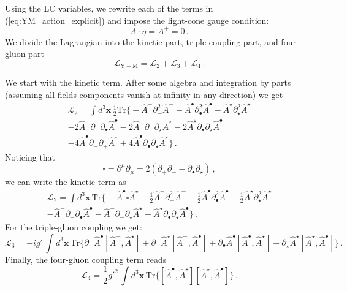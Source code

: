 \documentclass[english,american]{article}
\begin{document}
Using the LC variables, we rewrite each of the terms in (\ref{eq:YM_action_explicit})
and impose the light-cone gauge condition:
\begin{equation}
A\cdot\eta=A^{+}=0\,.
\end{equation}
We divide the Lagrangian into the kinetic part, triple-coupling part,
and four-gluon part
\begin{equation}
\mathcal{L}_{\mathrm{Y-M}}=\mathcal{L}_{2}+\mathcal{L}_{3}+\mathcal{L}_{4}\,.\label{eq:LagrangianFull}
\end{equation}
 

We start with the kinetic term. After some algebra and integration
by parts (assuming all fields components vanish at infinity in any
direction) we get
\begin{multline}
\mathcal{L}_{2}=\int d^{3}\mathbf{x}\,\frac{1}{2}\mathrm{Tr}\Bigg\{-\hat{A}^{-}\partial_{-}^{2}\hat{A}^{-}-\hat{A}^{\bullet}\partial_{\bullet}^{2}\hat{A}^{\bullet}-\hat{A}^{\star}\partial_{\star}^{2}\hat{A}^{\star}\\
-2\hat{A}^{-}\partial_{-}\partial_{\bullet}\hat{A}^{\bullet}-2\hat{A}^{-}\partial_{-}\partial_{\star}\hat{A}^{\star}-2\hat{A}^{\star}\partial_{\bullet}\partial_{\star}\hat{A}^{\bullet}\\
-4\hat{A}^{\bullet}\partial_{-}\partial_{+}\hat{A}^{\star}+4\hat{A}^{\bullet}\partial_{\bullet}\partial_{\star}\hat{A}^{\star}\Bigg\}\,.
\end{multline}
Noticing that
\begin{equation}
\square=\partial^{\mu}\partial_{\mu}=2\left(\partial_{+}\partial_{-}-\partial_{\bullet}\partial_{\star}\right)\,,
\end{equation}
we can write the kinetic term  as
\begin{multline}
\mathcal{L}_{2}=\int d^{3}\mathbf{x}\,\mathrm{Tr}\Bigg\{-\hat{A}^{\bullet}\square\hat{A}^{\star}-\frac{1}{2}\hat{A}^{-}\partial_{-}^{2}\hat{A}^{-}-\frac{1}{2}\hat{A}^{\bullet}\partial_{\bullet}^{2}\hat{A}^{\bullet}-\frac{1}{2}\hat{A}^{\star}\partial_{\star}^{2}\hat{A}^{\star}\\
-\hat{A}^{-}\partial_{-}\partial_{\bullet}\hat{A}^{\bullet}-\hat{A}^{-}\partial_{-}\partial_{\star}\hat{A}^{\star}-\hat{A}^{\star}\partial_{\bullet}\partial_{\star}\hat{A}^{\bullet}\Bigg\}\,.
\end{multline}
For the triple-gluon coupling we get:
\begin{equation}
\mathcal{L}_{3}=-ig'\,\int d^{3}\mathbf{x}\,\mathrm{Tr}\Bigg\{\partial_{-}\hat{A}^{\bullet}\left[\hat{A}^{-},\hat{A}^{\star}\right]+\partial_{-}\hat{A}^{\star}\left[\hat{A}^{-},\hat{A}^{\bullet}\right]+\partial_{\bullet}\hat{A}^{\bullet}\left[\hat{A}^{\bullet},\hat{A}^{\star}\right]+\partial_{\star}\hat{A}^{\star}\left[\hat{A}^{\star},\hat{A}^{\bullet}\right]\Bigg\}\,.
\end{equation}
Finally, the  four-gluon coupling term reads
\begin{equation}
\mathcal{L}_{4}=\frac{1}{2}g'^{2}\,\int d^{3}\mathbf{x}\,\mathrm{Tr}\Bigg\{\left[\hat{A}^{\bullet},\hat{A}^{\star}\right]\left[\hat{A}^{\star},\hat{A}^{\bullet}\right]\Bigg\}\,.
\end{equation}
\end{document}
